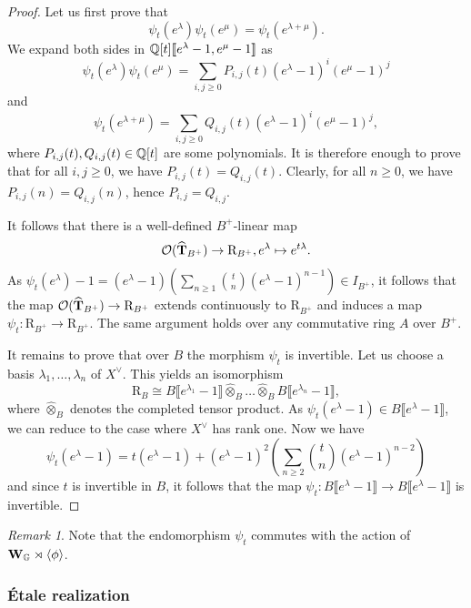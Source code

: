 \documentclass[a4paper, 10pt, oneside, reqno]{amsart}
\theoremstyle{plain}
\theoremstyle{definition}
\theoremstyle{remark}
\newtheorem{rque}[thm]{Remark}
\newcommand{\Gbb}{\mathbb{G}}
\newcommand{\RR}{\mathrm{R}}
\begin{document}
\begin{proof}
Let us first prove that 
$$\psi_t(e^{\lambda})\psi_t(e^{\mu}) = \psi_t(e^{\lambda + \mu}).$$
We expand both sides in $\mathbb{Q}[t]\llbracket e^{\lambda}-1, e^{\mu}-1\rrbracket$ as 
$$\psi_t(e^{\lambda})\psi_t(e^{\mu}) = \sum_{i,j\geq 0} P_{i,j}(t)(e^{\lambda}-1)^i(e^{\mu}-1)^j$$
and 
$$\psi_t(e^{\lambda + \mu}) = \sum_{i,j\geq 0} Q_{i,j}(t)(e^{\lambda}-1)^i(e^{\mu}-1)^j,$$
where $P_{i,j}(t), Q_{i,j}(t) \in \mathbb{Q}[t]$ are some polynomials. It is therefore enough to prove that for all $i,j \geq 0$, we have $P_{i,j}(t) = Q_{i,j}(t)$. Clearly, for all $n \geq 0$, we have $P_{i,j}(n) = Q_{i,j}(n)$, hence $P_{i,j} = Q_{i,j}$. 

It follows that there is a well-defined $B^+$-linear map 
$$\Ocal(\widehat{\Tbf}_{B^+}) \to \RR_{B^+}, e^{\lambda} \mapsto e^{t\lambda}.$$
As $\psi_t(e^{\lambda}) - 1 = (e^{\lambda} - 1)\left(\sum_{n \geq 1}\binom{t}{n}(e^{\lambda} - 1)^{n-1}\right) \in I_{B^+}$, it follows that the map 
$\Ocal(\widehat{\Tbf}_{B^+}) \to \RR_{B^+}$ extends continuously to $\RR_{B^+}$ and induces a map $\psi_t : \RR_{B^+} \to \RR_{B^+}$. The same argument holds over any commutative ring $A$ over $B^+$. 

It remains to prove that over $B$ the morphism $\psi_t$ is invertible. Let us choose a basis $\lambda_1, \dots, \lambda_n$ of $X^{\vee}$. This yields an isomorphism 
$$\RR_B \cong B\llbracket e^{\lambda_1} - 1 \rrbracket \widehat{\otimes}_B \dots \widehat{\otimes}_B B\llbracket e^{\lambda_n} - 1 \rrbracket,$$
where $\widehat{\otimes}_B$ denotes the completed tensor product. As $\psi_t(e^{\lambda} - 1) \in B\llbracket e^{\lambda} - 1 \rrbracket$, we can reduce to the case where $X^{\vee}$ has rank one. Now we have 
$$\psi_t(e^{\lambda} - 1) = t(e^{\lambda} - 1) + (e^{\lambda} - 1)^2\left(\sum_{n \geq 2}\binom{t}{n}(e^{\lambda} - 1)^{n-2}\right)$$
and since $t$ is invertible in $B$, it follows that the map $\psi_t : B\llbracket e^{\lambda} - 1 \rrbracket \to B\llbracket e^{\lambda} - 1 \rrbracket$ is invertible. 
\end{proof}

\begin{rque}
Note that the endomorphism $\psi_t$ commutes with the action of $\Wbf_{\Gbb} \rtimes \langle \phi \rangle$.
\end{rque} 

\subsubsection{\'{E}tale realization}
\end{document}
